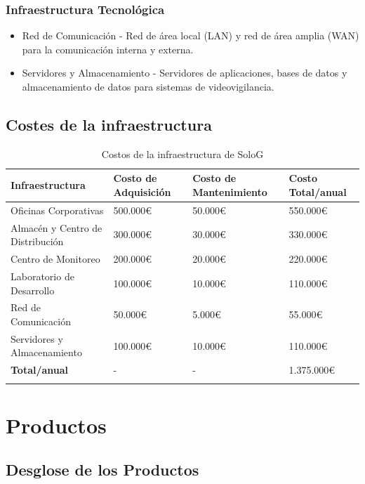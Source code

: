 \documentclass{report}
\begin{document}
            \subsubsection*{Infraestructura Tecnológica}
              \begin{itemize}
                \item Red de Comunicación - Red de área local (LAN) y red de área amplia (WAN) para la comunicación interna y externa.
                \item Servidores y Almacenamiento - Servidores de aplicaciones, bases de datos y almacenamiento de datos para sistemas de videovigilancia.
              \end{itemize}
          \clearpage\subsection{Costes de la infraestructura}
            \begin{longtable}{|p{4cm}|p{4cm}|p{4cm}|p{4cm}|}
              \hline
              \textbf{Infraestructura} & \textbf{Costo de Adquisición} & \textbf{Costo de Mantenimiento} & \textbf{Costo Total/anual}\\
              \hline
              \hline
              Oficinas Corporativas & 500.000€ & 50.000€ & 550.000€\\
              \hline
              Almacén y Centro de Distribución & 300.000€ & 30.000€ & 330.000€\\
              \hline
              Centro de Monitoreo & 200.000€ & 20.000€ & 220.000€\\
              \hline
              Laboratorio de Desarrollo & 100.000€ & 10.000€ & 110.000€\\
              \hline
              Red de Comunicación & 50.000€ & 5.000€ & 55.000€\\
              \hline
              Servidores y Almacenamiento & 100.000€ & 10.000€ & 110.000€\\
              \hline
              \textbf{Total/anual} & - & - & 1.375.000€\\
              \hline
              \caption{Costos de la infraestructura de SoloG}
            \end{longtable}
        \clearpage\section{Productos}
          \subsection{Desglose de los Productos}
\end{document}
